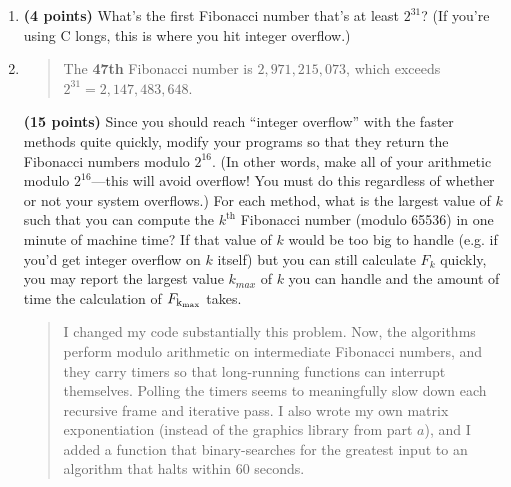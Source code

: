 \documentclass[11pt]{article}
\begin{document}
\begin{enumerate}[leftmargin=*]
\begin{enumerate}
\begin{quote}
  \medskip
  And new times. My matrix implementation and iterative are the same here, but the difference is at the nanosecond level, so asymptotic behavior is much more effectively approximated by the 16 second tests.
  \begin{itemize}
    \item Recursive: 15.025ms
    \item Iterative: 125ns
    \item Matrix (my implementation): n = 125ns
    \item Matrix (nalgebra crate): n = 83ns
  \end{itemize}
\end{quote}
\item
{\bf (4 points)}
What's the first Fibonacci number that's at least $2^{31}$? (If you're using C longs, this is where you hit
integer overflow.)
\item
  \begin{quote}
    \color{purple}
  The \textbf{47th} Fibonacci number is $2,971,215,073$, which exceeds $2^{31} = 2,147,483,648$. 
  \end{quote}
{\bf (15 points)}
Since you should reach ``integer overflow'' with the faster methods quite quickly, modify your programs
so that they return the Fibonacci numbers modulo $2^{16}$. (In other words, make all of your
arithmetic modulo $2^{16}$---this will avoid overflow! You must do this regardless of whether or not your
system overflows.) For each method, what is the largest value of $k$ such that you can compute the
$k^\text{th}$ Fibonacci number (modulo 65536) in one minute of machine time? If that value of $k$ would be too big to handle (e.g. if you'd get integer overflow on $k$ itself) but you can still calculate $F_{k}$ quickly, you may report the largest value $k_{max}$ of $k$ you can handle and the amount of time the calculation of $F_{\rm k_{max}}$ takes. 
\begin{quote}
  \color{purple}
  I changed my code substantially this problem. Now, the algorithms perform modulo arithmetic on intermediate Fibonacci numbers, and they carry timers so that long-running functions can interrupt themselves. Polling the timers seems to meaningfully slow down each recursive frame and iterative pass. I also wrote my own matrix exponentiation (instead of the graphics library from part $a$), and I added a function that binary-searches for the greatest input to an algorithm that halts within 60 seconds. 


\end{quote}
\end{enumerate}
\end{enumerate}
\end{document}

